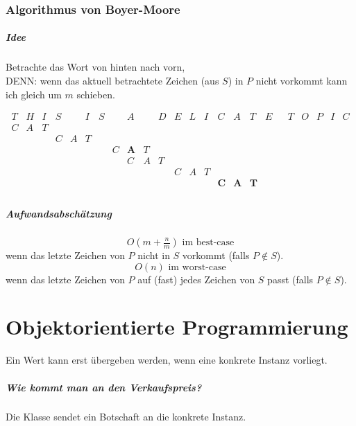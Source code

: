 \documentclass[a4paper,twoside,DIV15,BCOR12mm]{scrbook}
\begin{document}
\subsection{Algorithmus von Boyer-Moore}

\paragraph{Idee} Betrachte das Wort von hinten nach vorn, \\
	DENN: wenn das aktuell betrachtete Zeichen (aus $S$) in $P$ nicht vorkommt kann ich gleich um $m$ schieben.
	
$$\begin{array}{cccccccccccccccccccccccc}
	T & H & I & S &   & I & S &   & A &  & D & E & L & I & C & A & T & E &  & T & O & P & I & C \\
  C & A & T \\
    &   &   & C & A & T \\
    &   &   &   &   &   &   & C & \textbf{A} & T \\
    &   &   &   &   &   &   &   & C & A & T \\
    &   &   &   &   &   &   &   &   &   &   & C & A & T \\
    &   &   &   &   &   &   &   &   &   &   &   &   &   & \textbf{C} & \textbf{A} & \textbf{T} \\
\end{array}$$

\paragraph{Aufwandsabschätzung}
	$$O\left(m+\tfrac{n}{m}\right) \text{ im best-case}$$
	wenn das letzte Zeichen von $P$ nicht in $S$ vorkommt (falls $P \notin S$).
	$$O(n) \text{ im worst-case}$$
	wenn das letzte Zeichen von $P$ auf (fast) jedes Zeichen von $S$ passt (falls $P \notin S$).

\chapter{Objektorientierte Programmierung}

Ein Wert kann erst übergeben werden, wenn eine konkrete Instanz vorliegt.

\paragraph{Wie kommt man an den Verkaufspreis?}
Die Klasse sendet ein Botschaft an die konkrete Instanz.
\end{document}
